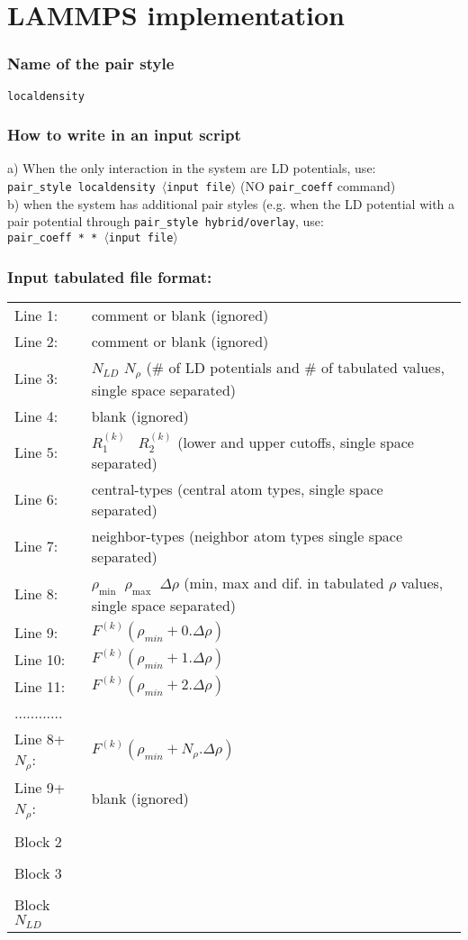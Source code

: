 \documentclass[12pt,a4paper]{article}
\begin{document}
\section*{LAMMPS implementation}
\subsubsection*{Name of the pair style}
\texttt{localdensity}
%
\subsubsection*{How to write in an input script}
a) When the only interaction in the system are LD potentials, use:\\
\texttt{pair\_style localdensity $\langle$input file$\rangle$} (NO \texttt{pair\_coeff} command)\\

\noindent b) when the system has additional pair styles (e.g. when the LD potential with a pair potential through \texttt{pair\_style hybrid/overlay}, use:\\
\texttt{pair\_coeff *  * $\langle$input file$\rangle$}

\subsubsection*{Input tabulated file format:}
\begin{tabular}{l l}
Line 1:   & comment or blank (ignored)\\
Line 2:  & comment or blank (ignored)\\
Line 3:  & $N_{LD}$ $N_{\rho}$ (\# of LD potentials and \# of tabulated values, single space separated)\\
Line 4:  & blank (ignored)\\
Line 5:  & $R_1^{(k)} \; \; \; R_2^{(k)}$ (lower and upper cutoffs, single space separated)\\
Line 6: 	& central-types (central atom types, single space separated)\\
Line 7: 	& neighbor-types (neighbor atom types single space separated)\\
Line 8: 	& $\rho_{\mathrm{min}} \; \; \rho_{\mathrm{max}} \; \; \Delta \rho$ (min, max and dif. in tabulated $\rho$ values, single space separated)\\
Line 9: 	& $F^{(k)}(\rho_{min} + 0.\Delta \rho)$\\
Line 10:	& $F^{(k)}(\rho_{min} + 1.\Delta \rho)$\\
Line 11:	& $F^{(k)}(\rho_{min} + 2.\Delta \rho)$\\
............& { }\\
Line 8+$N_\rho$: &  $F^{(k)}(\rho_{min} + N_\rho . \Delta \rho)$\\	
Line 9+$N_\rho$: & blank (ignored)\\
\\
Block 2 & { }\\
\\
Block 3 & { }\\
\\
Block $N_{LD}$ & { }
\end{tabular}
\\
\end{document}
